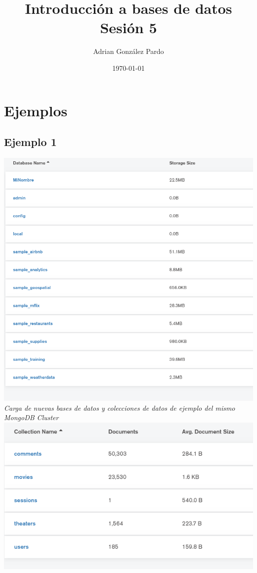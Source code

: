 \documentclass[10pt]{article}
\title{Introducción a bases de datos\\Sesión 5}
\author{Adrian González Pardo}
\date{\today}
\begin{document}
\maketitle
\section{Ejemplos}
\subsection{Ejemplo 1}
\begin{center}
  \includegraphics[scale=0.35]{imgs/ej1_1.png}\\
  \textit{Carga de nuevas bases de datos y colecciones de datos de ejemplo del mismo MongoDB Cluster}\\
  \includegraphics[scale=0.35]{imgs/ej1_2.png}\\

\end{center}
\end{document}
